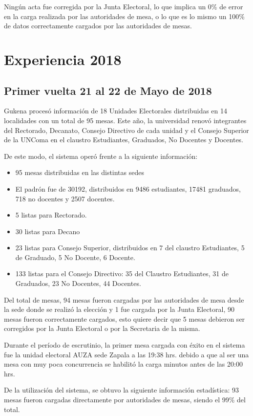 Ningún acta fue corregida por la Junta Electoral, lo que implica un 0\% de error en la carga realizada por las autoridades de mesa, o lo que es lo mismo un 100\% de datos correctamente cargados por las autoridades de mesas.

\section{Experiencia 2018}
\subsection{Primer vuelta 21 al 22 de Mayo de 2018}
Gukena procesó información de 18 Unidades Electorales distribuidas en 14 localidades con un total de 95 mesas. Este año, la universidad renovó integrantes del Rectorado, Decanato, Consejo Directivo de cada unidad y el Consejo Superior de la UNComa en el claustro Estudiantes, Graduados, No Docentes y Docentes.

De este modo, el sistema operó frente a la siguiente información:
\begin{itemize}
    \item 95 mesas distribuidas en las distintas sedes 
     \item El padrón fue de  30192, distribuidos en 9486 estudiantes, 17481 graduados, 718 no docentes y 2507 docentes.
     \item 5 listas para Rectorado.
     \item 30 listas para Decano
    \item 23 listas para Consejo Superior, distribuidos en 7 del claustro Estudiantes, 5 de Graduado, 5 No Docente, 6 Docente.
    \item 133 listas para el Consejo Directivo: 35 del Claustro Estudiantes, 31 de Graduados, 23 No Docentes, 44 Docentes.
\end{itemize}
Del total de mesas, 94 mesas fueron cargadas por las autoridades de mesa desde la sede donde se realizó la elección y 1 fue cargada por la Junta Electoral, 90 mesas fueron correctamente cargados, esto quiere decir que 5 mesas debieron ser corregidos por la Junta Electoral o por la Secretaria de la misma.

Durante el período de escrutinio, la primer mesa cargada con éxito en el sistema fue la unidad electoral AUZA sede Zapala a las 19:38 hrs. debido a que al ser una mesa con muy poca concurrencia se habilitó la carga minutos antes de las 20:00 hrs.

De la utilización del sistema, se obtuvo la siguiente información estadística:
93 mesas fueron cargadas directamente por autoridades de mesas, siendo el 99\% del total.

